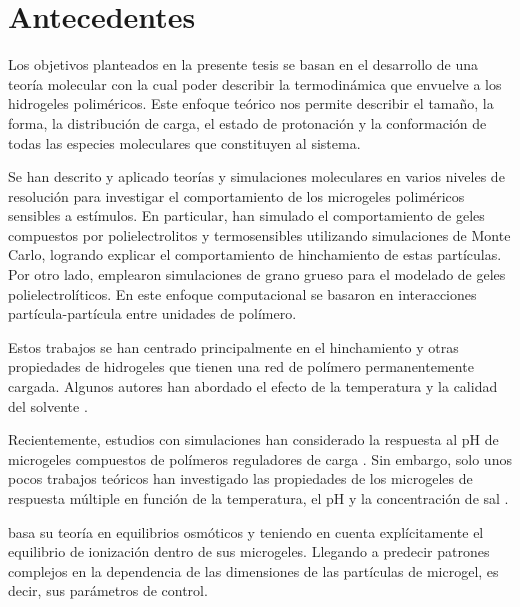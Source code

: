 \section{Antecedentes}

Los objetivos planteados en la presente tesis se basan en el desarrollo de una teor\'ia molecular con la cual poder describir la termodin\'amica que envuelve a los hidrogeles polim\'ericos.
Este enfoque te\'orico nos permite describir el tama\~no, la forma, la distribuci\'on de carga, el estado de protonaci\'on y la conformaci\'on de todas las especies moleculares que constituyen al sistema.

Se han descrito y aplicado teor\'ias y simulaciones moleculares en varios niveles de resoluci\'on para investigar el comportamiento de los microgeles polim\'ericos sensibles a est\'imulos.
En particular, \citet{quesada2011gel} han simulado el comportamiento de geles compuestos por polielectrolitos y termosensibles utilizando simulaciones de Monte Carlo, logrando explicar el comportamiento de hinchamiento de estas part\'iculas. Por otro lado, \citet{ahualli2016coarse} emplearon simulaciones de grano grueso para el modelado de geles polielectrol\'iticos. En este enfoque computacional se basaron en interacciones part\'icula-part\'icula entre unidades de pol\'imero.

Estos trabajos se han centrado principalmente en el hinchamiento y otras propiedades de hidrogeles que tienen una red de pol\'imero permanentemente cargada. Algunos autores han abordado el efecto de la temperatura y la calidad del solvente \cite{Jha2011, QuesadaPerez2013, moncho-jorda2016a, ahualli2016coarse, AdroherBenitez2017PCCP}.

Recientemente, estudios con simulaciones han considerado la respuesta al pH de microgeles compuestos de pol\'imeros reguladores de carga \cite{Schroeder2015,Rud2017,Sean2018, Hofzumahaus2018,Lu2019}.
Sin embargo, solo unos pocos trabajos te\'oricos han investigado las propiedades de los microgeles de respuesta m\'ultiple en funci\'on de la temperatura, el pH y la concentraci\'on de sal \cite{CaprilesGonzalez2008,polotsky2013collapse}.

\citet{polotsky2013collapse} basa su teor\'ia en equilibrios osm\'oticos y teniendo en cuenta expl\'icitamente el equilibrio de ionizaci\'on dentro de sus microgeles. Llegando a predecir patrones complejos en la dependencia de las dimensiones de las part\'iculas de microgel, es decir, sus par\'ametros de control.

